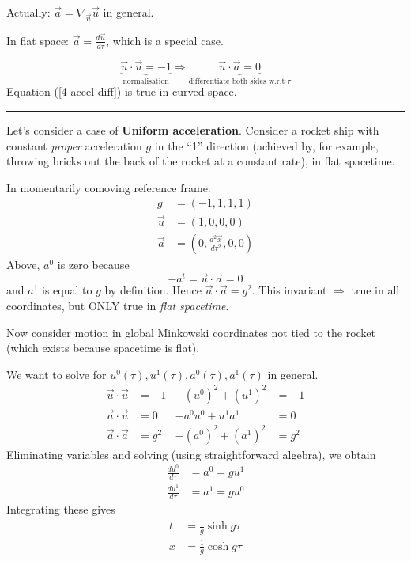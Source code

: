 \documentclass[a4paper]{article} %
\begin{document}
Actually: $\vec{a}=\nabla_{\vec{u}}\vec{u}$ in general.

In flat space: $\vec{a}=\frac{d\vec{u}}{d\tau}$, which is a special case.

\begin{equation}
\underbrace{\vec{u}\cdot\vec{u}=-1}_{\text{normalisation}}\Rightarrow \underbrace{\vec{u}\cdot\vec{a}=0}_{\text{differentiate both sides w.r.t $\tau$}}\label{4-accel diff}
\end{equation}
Equation (\ref{4-accel diff}) is true in curved space.

\hrule

Let's consider a case of \textbf{Uniform acceleration}. Consider a rocket ship with constant \emph{proper} acceleration $g$ in the ``1'' direction (achieved by, for example, throwing bricks out the back of the rocket at a constant rate), in flat spacetime.

In momentarily comoving reference frame:
\begin{align*}
g&=(-1,1,1,1)\\
\vec{u}&=(1,0,0,0)\\
\vec{a}&=(0,\frac{d^2\vec{x}}{d\tau^2},0,0)
\end{align*}
Above, $a^0$ is zero because
\begin{equation}
-a^t=\vec{u}\cdot\vec{a}=0
\end{equation}
and $a^1$ is equal to $g$ by definition. Hence $\vec{a}\cdot\vec{a}=g^2$. This invariant $\Rightarrow$ true in all coordinates, but ONLY true in \emph{flat spacetime}.

Now consider motion in global Minkowski coordinates not tied to the rocket (which exists because spacetime is flat).

We want to solve for $u^0(\tau),u^1(\tau),a^0(\tau),a^1(\tau)$ in general.
\begin{align*}
\vec{u}\cdot\vec{u}&=-1&-(u^0)^2+(u^1)^2&=-1\\
\vec{a}\cdot\vec{u}&=0& -a^0 u^0+u^1 a^1&=0 \\
\vec{a}\cdot\vec{a}&=g^2& -(a^0)^2+(a^1)^2&=g^2
\end{align*}
Eliminating variables and solving (using straightforward algebra), we obtain 
\begin{align*}
\frac{du^0}{d\tau}&=a^0=gu^1\\
\frac{du^1}{d\tau}&=a^1=gu^0
\end{align*}
Integrating these gives
\begin{align*}
t&=\frac{1}{g}\sinh g\tau\\
x&=\frac{1}{g}\cosh g\tau
\end{align*}
\end{document}
